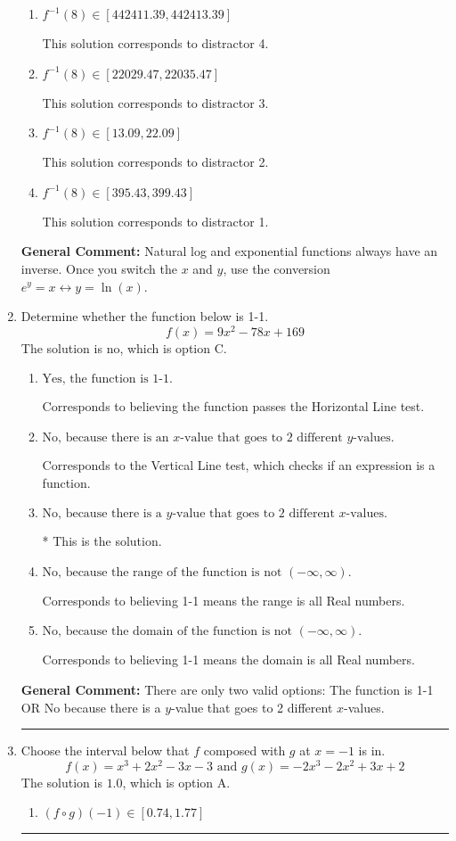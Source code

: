 \documentclass{extbook}[14pt]
\newcommand{\litem}[1]{\item #1

\rule{\textwidth}{0.4pt}}
\begin{document}
\begin{enumerate}
{\begin{enumerate}[label=\Alph*.]
 This is the solution.
\item \( f^{-1}(8) \in [442411.39, 442413.39] \)

 This solution corresponds to distractor 4.
\item \( f^{-1}(8) \in [22029.47, 22035.47] \)

 This solution corresponds to distractor 3.
\item \( f^{-1}(8) \in [13.09, 22.09] \)

 This solution corresponds to distractor 2.
\item \( f^{-1}(8) \in [395.43, 399.43] \)

 This solution corresponds to distractor 1.
\end{enumerate}

\textbf{General Comment:} Natural log and exponential functions always have an inverse. Once you switch the $x$ and $y$, use the conversion $ e^y = x \leftrightarrow y=\ln(x)$.
}
\litem{
Determine whether the function below is 1-1.
\[ f(x) = 9 x^2 - 78 x + 169 \]The solution is \( \text{no} \), which is option C.\begin{enumerate}[label=\Alph*.]
\item \( \text{Yes, the function is 1-1.} \)

Corresponds to believing the function passes the Horizontal Line test.
\item \( \text{No, because there is an $x$-value that goes to 2 different $y$-values.} \)

Corresponds to the Vertical Line test, which checks if an expression is a function.
\item \( \text{No, because there is a $y$-value that goes to 2 different $x$-values.} \)

* This is the solution.
\item \( \text{No, because the range of the function is not $(-\infty, \infty)$.} \)

Corresponds to believing 1-1 means the range is all Real numbers.
\item \( \text{No, because the domain of the function is not $(-\infty, \infty)$.} \)

Corresponds to believing 1-1 means the domain is all Real numbers.
\end{enumerate}

\textbf{General Comment:} There are only two valid options: The function is 1-1 OR No because there is a $y$-value that goes to 2 different $x$-values.
}
\litem{
Choose the interval below that $f$ composed with $g$ at $x=-1$ is in.
\[ f(x) = x^{3} +2 x^{2} -3 x -3 \text{ and } g(x) = -2x^{3} -2 x^{2} +3 x + 2 \]The solution is \( 1.0 \), which is option A.\begin{enumerate}[label=\Alph*.]
\item \( (f \circ g)(-1) \in [0.74, 1.77] \)


\end{enumerate}}
\end{enumerate}
\end{document}
